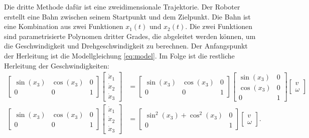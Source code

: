 Die dritte Methode dafür ist eine zweidimensionale Trajektorie. Der Roboter erstellt eine Bahn zwischen seinem Startpunkt und dem Zielpunkt. Die Bahn ist eine Kombination aus zwei Funktionen \(x_1(t)\) und \(x_2(t)\). Die zwei Funktionen sind parametrisierte Polynomen dritter Grades, die abgeleitet werden können, um die Geschwindigkeit und Drehgeschwindigkeit zu berechnen. Der Anfangspunkt der Herleitung ist die Modellgleichung \ref{eq:model}. Im Folge ist die restliche Herleitung der Geschwindigkeiten: 
\begin{align*}
    \begin{bmatrix*}
        \sin(x_3) & \cos(x_3) & 0 \\
        0 & 0 & 1
    \end{bmatrix*}
    \begin{bmatrix*}
        \dot{x}_1 \\
        \dot{x}_2 \\
        \dot{x}_3
    \end{bmatrix*}
    &=
    \begin{bmatrix*}
        \sin(x_3) & \cos(x_3) & 0 \\
        0 & 0 & 1
    \end{bmatrix*}
    \begin{bmatrix*}
        \sin(x_3) & 0 \\
        \cos(x_3) & 0 \\
        0 & 1
    \end{bmatrix*}
    \begin{bmatrix*}
        v \\
        \omega
    \end{bmatrix*} \\
    \begin{bmatrix*}
        \sin(x_3) & \cos(x_3) & 0 \\
        0 & 0 & 1
    \end{bmatrix*}
    \begin{bmatrix*}
        \dot{x}_1 \\
        \dot{x}_2 \\
        \dot{x}_3
    \end{bmatrix*}
    &=
    \begin{bmatrix*}
        \sin^2(x_3) + \cos^2(x_3) & 0 \\
        0 & 1
    \end{bmatrix*}
    \begin{bmatrix*}
        v \\
        \omega
    \end{bmatrix*}.
\end{align*}

